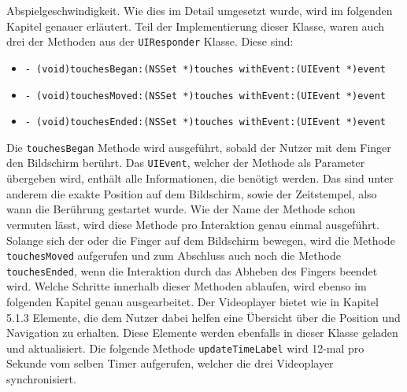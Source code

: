 \documentclass[11pt,a4paper]{report}
\begin{document}
Abspielgeschwindigkeit. Wie dies im Detail umgesetzt wurde, wird im folgenden Kapitel genauer erläutert. Teil der Implementierung dieser Klasse, waren auch drei der Methoden aus der \texttt{UIResponder} Klasse. Diese sind:
\begin{itemize}
\item \texttt{- (void)touchesBegan:(NSSet *)touches \-withEvent:(UIEvent *)\-event}
\item \texttt{- (void)touchesMoved:(NSSet *)touches \-withEvent:(UIEvent *)\-event}
\item \texttt{- (void)touchesEnded:(NSSet *)touches \-withEvent:(UIEvent *)\-event}
\end{itemize}
Die \texttt{touchesBegan} Methode wird ausgeführt, sobald der Nutzer mit dem Finger den Bildschirm berührt. Das \texttt{UIEvent}, welcher der Methode als Parameter übergeben wird, enthält alle Informationen, die benötigt werden. Das sind unter anderem die exakte Position auf dem Bildschirm, sowie der Zeitstempel, also wann die Berührung gestartet wurde. Wie der Name der Methode schon vermuten lässt, wird diese Methode pro Interaktion genau einmal ausgeführt. Solange sich der oder die Finger auf dem Bildschirm bewegen, wird die Methode \texttt{touchesMoved} aufgerufen und zum Abschluss auch noch die Methode \texttt{touchesEnded}, wenn die Interaktion durch das Abheben des Fingers beendet wird. Welche Schritte innerhalb dieser Methoden ablaufen, wird ebenso im folgenden Kapitel genau ausgearbeitet. Der Videoplayer bietet wie in Kapitel 5.1.3 Elemente, die dem Nutzer dabei helfen eine Übersicht über die Position und Navigation zu erhalten. Diese Elemente werden ebenfalls in dieser Klasse geladen und aktualisiert. Die folgende Methode \texttt{updateTimeLabel} wird 12-mal pro Sekunde vom selben Timer aufgerufen, welcher die drei Videoplayer synchronisiert.
\end{document}
